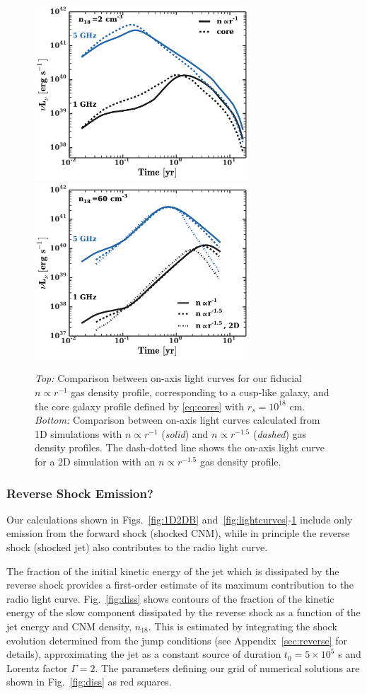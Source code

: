 \documentclass[usenatbib,fleqn]{mnras}
\begin{document}
\begin{figure} 
  \includegraphics[width=8cm]{fig_cores.pdf}
  \includegraphics[width=8cm]{prof.pdf}
  \caption{\label{fig:cores} {\it Top:} Comparison between on-axis
    light curves for our fiducial $n\propto r^{-1}$ gas density
    profile, corresponding to a cusp-like galaxy, and the core galaxy
    profile defined by \eqref{eq:cores} with $r_s=10^{18}$ cm. {\it
      Bottom:} Comparison between on-axis light curves calculated from
    1D simulations with $n\propto r^{-1}$ ({\it solid}) and $n\propto
    r^{-1.5}$ ({\it dashed}) gas density profiles. The dash-dotted line
    shows the on-axis light curve for a 2D simulation with an
    $n\propto r^{-1.5}$ gas density profile.}
\end{figure}


\subsubsection{Reverse Shock Emission?}
Our calculations shown in Figs.~\ref{fig:1D2DB}
and~\ref{fig:lightcurves}-\ref{fig:cores} include only emission from
the forward shock (shocked CNM), while in principle the reverse shock
(shocked jet) also contributes to the radio light curve.

The fraction of the initial kinetic energy of the jet which is
dissipated by the reverse shock provides a first-order estimate of its
maximum contribution to the radio light curve.  Fig.~\ref{fig:diss}
shows contours of the fraction of the kinetic energy of the slow
component dissipated by the reverse shock as a function of the jet
energy and CNM density, $n_{18}$.  This is estimated by integrating
the shock evolution determined from the jump conditions (see
Appendix~\ref{sec:reverse} for details), approximating the jet as a
constant source of duration $t_0 = 5 \times 10^{5}$ s and Lorentz
factor $\Gamma = 2$.  The parameters defining our grid of numerical
solutions are shown in Fig.~\ref{fig:diss} as red squares.
\end{document}
